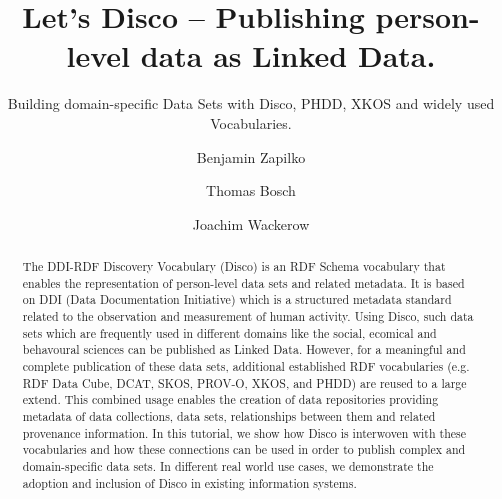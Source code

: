 \documentclass{llncs}
\begin{document}
%
%
\title{Let’s Disco – Publishing person-level data as Linked Data.}
\subtitle{Building domain-specific Data Sets with Disco, PHDD, XKOS and widely used Vocabularies.
}
%
%
\author{Benjamin Zapilko \and Thomas Bosch \and Joachim Wackerow}
%
%

\maketitle              %

\begin{abstract}
The DDI-RDF Discovery Vocabulary (Disco) is an RDF Schema vocabulary that enables the representation of person-level data sets and related metadata.
It is based on DDI (Data Documentation Initiative) which is a structured metadata standard related to the observation and measurement of human activity.
Using Disco, such data sets which are frequently used in different domains like the social, ecomical and behavoural sciences can be published as Linked Data. 
However, for a meaningful and complete publication of these data sets, additional established RDF vocabularies (e.g. RDF Data Cube, DCAT, SKOS, PROV-O, XKOS, and PHDD) are reused to a large extend. 
This combined usage enables the creation of data repositories providing metadata of data collections, data sets, relationships between them and related provenance information. 
In this tutorial, we show how Disco is interwoven with these vocabularies and how these connections can be used in order to publish complex and domain-specific data sets.
In different real world use cases, we demonstrate the adoption and inclusion of Disco in existing information systems. 

 

\end{abstract}
%
\end{document}
